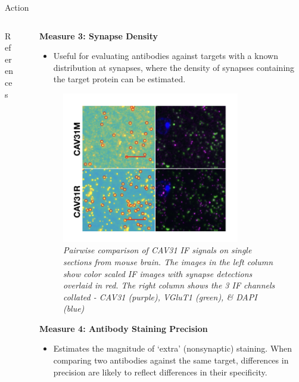 \documentclass[final, table]{beamer}
\newlength{\sepwid}
\newlength{\onecolwid}
\newlength{\twocolwid}
\begin{document}
\begin{frame}[t]
\begin{columns}[t]
\begin{column}{\twocolwid}
\begin{block}{Action}
\begin{columns}[t]
\begin{column}{\onecolwid}
\begin{block}{References}
{\begin{thebibliography}{99}
\end{thebibliography}}
\end{block}



\end{column}


\begin{column}{\sepwid}\end{column}  %
\begin{column}{\onecolwid}

\textbf{Measure 3: Synapse Density} 
\begin{itemize} 
\item Useful for evaluating antibodies against targets with a known distribution at synapses, where the density of synapses containing the target protein can be estimated.
\end{itemize} 


\begin{figure}
\centering
\includegraphics[width=0.8\textwidth]{figs/synapsedetection}
\caption{\textit{Pairwise comparison of CAV31 IF signals on single sections from mouse brain.  The images in the left column show color scaled IF images with synapse detections overlaid in red.  The right column shows the 3 IF channels collated - CAV31 (purple), VGluT1 (green), \& DAPI (blue)} }
\end{figure}


\textbf{Measure 4: Antibody Staining Precision} 

\begin{itemize} 
\item Estimates the magnitude of `extra' (nonsynaptic) staining. When comparing two antibodies against the same target, differences in precision are likely to reflect differences in their specificity.  
\end{itemize} 



\end{column}
\end{columns}
\end{block}
\end{column}
\end{columns}
\end{frame}
\end{document}
